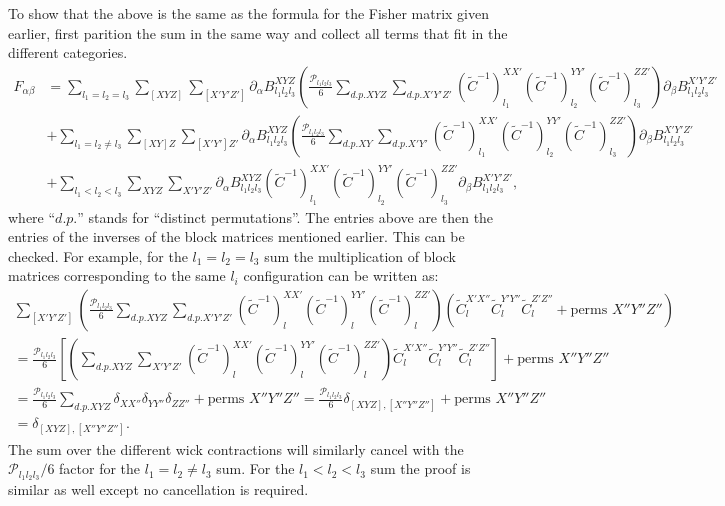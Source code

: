 \documentclass[11pt]{article} %
\newcommand{\br}[1]{\ensuremath{\left( #1 \right)}}
\newcommand{\sbr}[1]{\ensuremath{\left[ #1 \right]}}
\begin{document}
To show that the above is the same as the formula for the Fisher matrix given earlier, first parition the sum in the same way and collect all terms that fit in the different categories.
\begin{align*}
    F_{\alpha\beta} &= \sum_{l_1=l_2=l_3} \sum_{[XYZ]}\sum_{[X'Y'Z']} \partial_{\alpha} B^{XYZ}_{l_1 l_2 l_3}\br{\frac{\mathcal P _{l_1l_2l_3}}{6}\sum_{d. p. XYZ} \sum_{d. p. X'Y'Z'}(\tilde C^{-1})^{X X'}_{l_1}
    (\tilde C^{-1})^{Y Y'}_{l_2}
    (\tilde C^{-1})^{Z Z'}_{l_3}}
    \partial_\beta B^{X' Y' Z'}_{l_1 l_2 l_3} \\
    &+ \sum_{l_1=l_2\neq l_3} \sum_{[XY]Z}\sum_{[X'Y']Z'} \partial_{\alpha} B^{XYZ}_{l_1 l_2 l_3}\br{\frac{\mathcal P _{l_1l_2l_3}}{6}\sum_{d. p. XY} \sum_{d. p. X'Y'}(\tilde C^{-1})^{X X'}_{l_1}
    (\tilde C^{-1})^{Y Y'}_{l_2}
    (\tilde C^{-1})^{Z Z'}_{l_3}}
    \partial_\beta B^{X' Y' Z'}_{l_1 l_2 l_3} \\
    &+ \sum_{l_1<l_2<l_3} \sum_{XYZ}\sum_{X'Y'Z'} \partial_{\alpha} B^{XYZ}_{l_1 l_2 l_3}(\tilde C^{-1})^{X X'}_{l_1}
    (\tilde C^{-1})^{Y Y'}_{l_2}
    (\tilde C^{-1})^{Z Z'}_{l_3}
    \partial_\beta B^{X' Y' Z'}_{l_1 l_2 l_3},
\end{align*}
where ``$d. p.$'' stands for ``distinct permutations''.
The entries above are then the entries of the inverses of the block matrices mentioned earlier. This can be checked. For example, for the $l_1 = l_2 = l_3$ sum the multiplication of block matrices corresponding to the same $l_i$ configuration can be written as:
\begin{gather*}
    \sum_{[X'Y'Z']} \br{\frac{\mathcal P _{l_1l_2l_3}}{6} \sum_{d. p. XYZ} \sum_{d. p. X'Y'Z'}(\tilde C^{-1})^{X X'}_{l}
    (\tilde C^{-1})^{Y Y'}_{l}
    (\tilde C^{-1})^{Z Z'}_{l}} \br{\tilde C^{X'X''}_l \tilde C^{Y'Y''}_l \tilde C^{Z'Z''}_l + \text{perms } X''Y''Z''} \\
    = \frac{\mathcal P _{l_1l_2l_3}}{6}\sbr{\br{\sum_{d. p. XYZ} \sum_{X'Y'Z'}(\tilde C^{-1})^{X X'}_{l}
    (\tilde C^{-1})^{Y Y'}_{l}
    (\tilde C^{-1})^{Z Z'}_{l}} \tilde C^{X'X''}_l \tilde C^{Y'Y''}_l \tilde C^{Z'Z''}_l} + \text{perms } X''Y''Z'' \\
    = \frac{\mathcal P _{l_1l_2l_3}}{6} \sum_{d. p. XYZ} \delta_{XX''}\delta_{YY''}\delta_{ZZ''} + \text{perms } X''Y''Z''
    = \frac{\mathcal P _{l_1l_2l_3}}{6} \delta_{[XYZ], [X''Y''Z'']} + \text{perms } X''Y''Z''\\
    = \delta_{[XYZ], [X''Y''Z'']} .
\end{gather*}
The sum over the different wick contractions will similarly cancel with the $\mathcal P_{l_1l_2l_3} / 6$ factor for the $l_1 = l_2 \neq l_3$ sum. For the $l_1 < l_2 < l_3$ sum the proof is similar as well except no cancellation is required.
\end{document}
